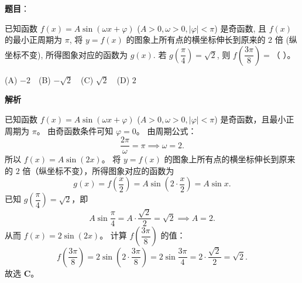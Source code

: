 \begin{answer}

\textbf{题目}：

已知函数 $f(x) = A \sin(\omega x + \varphi)$ ($A > 0, \omega > 0, |\varphi| < \pi$) 是奇函数, 且 $f(x)$ 的最小正周期为 $\pi$, 将 $y = f(x)$ 的图象上所有点的横坐标伸长到原来的 $2$ 倍 (纵坐标不变), 所得图象对应的函数为 $g(x)$. 若 $g\left(\dfrac{\pi}{4}\right) = \sqrt{2}$, 则 $f\left(\dfrac{3\pi}{8}\right) =$（ ）。

(A) $-2$　(B) $-\sqrt{2}$　(C) $\sqrt{2}$　(D) $2$

\textbf{解析}

已知函数 $f(x) = A \sin(\omega x + \varphi)$ ($A > 0, \omega > 0, |\varphi| < \pi$) 是奇函数，且最小正周期为 $\pi$。
由奇函数条件可知 $\varphi = 0$。
由周期公式：
\nopagebreak[4]
\[\frac{2\pi}{\omega} = \pi \implies \omega = 2.\]
所以 $f(x) = A \sin(2x)$。
将 $y = f(x)$ 的图象上所有点的横坐标伸长到原来的 $2$ 倍（纵坐标不变），所得图象对应的函数为
\nopagebreak[4]
\[g(x) = f\left(\frac{x}{2}\right) = A \sin\left(2 \cdot \frac{x}{2}\right) = A \sin x.\]
已知 $g\left(\dfrac{\pi}{4}\right) = \sqrt{2}$，即
\nopagebreak[4]
\[A \sin\frac{\pi}{4} = A \cdot \frac{\sqrt{2}}{2} = \sqrt{2} \implies A = 2.\]
从而 $f(x) = 2 \sin(2x)$。
计算 $f\left(\dfrac{3\pi}{8}\right)$ 的值：
\nopagebreak[4]
\[f\left(\frac{3\pi}{8}\right) = 2 \sin\left(2 \cdot \frac{3\pi}{8}\right) = 2 \sin\frac{3\pi}{4} = 2 \cdot \frac{\sqrt{2}}{2} = \sqrt{2}.\]
故选 \textbf{C}。


\end{answer}
